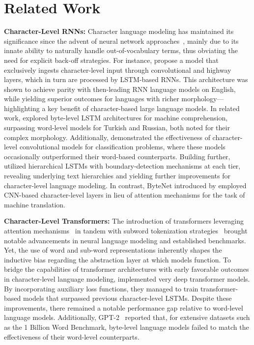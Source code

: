 \section{Related Work}
\label{section:related_work}

\textbf{Character-Level RNNs:} Character language modeling has maintained its significance since the advent of neural network approaches~\citep{sutskever2011generating,mikolov2012subword,graves2013generating}, mainly due to its innate ability to naturally handle out-of-vocabulary terms, thus obviating the need for explicit back-off strategies. For instance, \cite{kim2016character} propose a model that exclusively ingests character-level input through convolutional and highway layers, which in turn are processed by LSTM-based RNNs. This architecture was shown to achieve parity with then-leading RNN language models on English, while yielding superior outcomes for languages with richer morphology—highlighting a key benefit of character-based large language models. In related work, \cite{kenter2018byte} explored byte-level LSTM architectures for machine comprehension, surpassing word-level models for Turkish and Russian, both noted for their complex morphology. Additionally, \cite{zhang2015character} demonstrated the effectiveness of character-level convolutional models for classification problems, where these models occasionally outperformed their word-based counterparts. Building further, \citet{chung2019hierarchical} utilized hierarchical LSTMs with boundary-detection mechanisms at each tier, revealing underlying text hierarchies and yielding further improvements for character-level language modeling. In contrast, ByteNet introduced by \cite{kalchbrenner2016neural} employed CNN-based character-level layers in lieu of attention mechanisms for the task of machine translation.

\textbf{Character-Level Transformers:} The introduction of transformers leveraging attention mechanisms~\citep{vaswani2017attention} in tandem with subword tokenization strategies~\citep{sennrich-etal-2016-neural} brought notable advancements in neural language modeling and established benchmarks. Yet, the use of word and sub-word representations inherently shapes the inductive bias regarding the abstraction layer at which models function. To bridge the capabilities of transformer architectures with early favorable outcomes in character-level language modeling, \citet{al2019character} implemented very deep transformer models. By incorporating auxiliary loss functions, they managed to train transformer-based models that surpassed previous character-level LSTMs. Despite these improvements, there remained a notable performance gap relative to word-level language models. Additionally, GPT-2~\citep{radfordgpt2} reported that, for extensive datasets such as the 1 Billion Word Benchmark, byte-level language models failed to match the effectiveness of their word-level counterparts.

